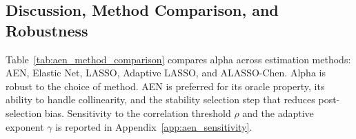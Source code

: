 



\subsection{Discussion, Method Comparison, and Robustness}
\label{sec:factor_discussion}

Table~\ref{tab:aen_method_comparison} compares alpha across estimation
methods: AEN, Elastic Net, LASSO, Adaptive LASSO, and ALASSO-Chen. Alpha is robust to
the choice of method. AEN is preferred for its oracle property, its
ability to handle collinearity, and the stability selection step that
reduces post-selection bias. Sensitivity to the correlation threshold
$\rho$ and the adaptive exponent $\gamma$ is reported in
Appendix~\ref{app:aen_sensitivity}.

